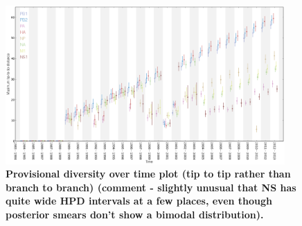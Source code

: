 \documentclass[11pt,oneside,letterpaper]{article}
\begin{document}
\begin{figure}[h]
	\centering		
	\includegraphics[width=0.95\textwidth]{figures/InfB_diversityOverTime}
	\caption{\textbf{Provisional diversity over time plot (tip to tip rather than branch to branch) (comment - slightly unusual that NS has quite wide HPD intervals at a few places, even though posterior smears don't show a bimodal distribution).}}
\end{figure}




\end{document}
